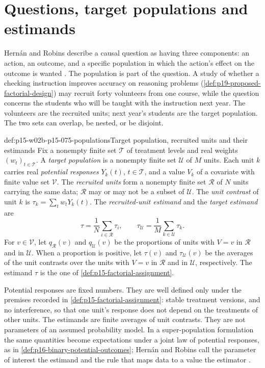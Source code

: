 \section{Questions, target populations and estimands}
\label{sec:p15-w02b-p15-075-estimands}

Hern\'an and Robins describe a causal question as having three components: an
action, an outcome, and a specific population in which the action's effect on
the outcome is wanted \cite[ch.~2, p.~13]{HernanRobins2020WhatIf2026}. The
population is part of the question. A study of whether a checking instruction
improves accuracy on reasoning problems (\cref{def:p19-proposed-factorial-design})
may recruit forty volunteers from one course, while the question concerns the
students who will be taught with the instruction next year. The volunteers are
the recruited units; next year's students are the target population. The two
sets can overlap, be nested, or be disjoint.

\begin{hbdefinition}{def:p15-w02b-p15-075-populations}{Target population, recruited units and their estimands}
Fix a nonempty finite set \(\mathcal T\) of treatment levels and real weights
\((w_t)_{t\in\mathcal T}\). A \emph{target population} is a nonempty finite
set \(\mathcal U\) of \(M\) units. Each unit \(k\) carries real
\emph{potential responses} \(Y_k(t)\), \(t\in\mathcal T\), and a value
\(V_k\) of a covariate with finite value set \(\mathcal V\). The
\emph{recruited units} form a nonempty finite set \(\mathcal R\) of \(N\)
units carrying the same data; \(\mathcal R\) may or may not be a subset of
\(\mathcal U\). The \emph{unit contrast} of unit \(k\) is
\(\tau_k=\sum_{t}w_tY_k(t)\). The \emph{recruited-unit estimand} and the
\emph{target estimand} are
\[
 \tau=\frac1N\sum_{i\in\mathcal R}\tau_i,\qquad
 \tau_{\mathcal U}=\frac1M\sum_{k\in\mathcal U}\tau_k .
\]
For \(v\in\mathcal V\), let \(q_{\mathcal R}(v)\) and \(q_{\mathcal U}(v)\)
be the proportions of units with \(V=v\) in \(\mathcal R\) and in
\(\mathcal U\). When a proportion is positive, let \(\tau(v)\) and
\(\tau_{\mathcal U}(v)\) be the averages of the unit contrasts over the units
with \(V=v\) in \(\mathcal R\) and in \(\mathcal U\), respectively. The
estimand \(\tau\) is the one of \cref{def:p15-factorial-assignment}.
\end{hbdefinition}

Potential responses are fixed numbers. They are well defined only under the
premises recorded in \cref{def:p15-factorial-assignment}: stable treatment
versions, and no interference, so that one unit's response does not depend on
the treatments of other units. The estimands are finite averages of unit
contrasts. They are not parameters of an assumed probability model. In a
super-population formulation the same quantities become expectations under a
joint law of potential responses, as in
\cref{def:p16-binary-potential-outcomes}; Hern\'an and Robins call the
parameter of interest the estimand and the rule that maps data to a value the
estimator \cite[\S10.1, p.~138]{HernanRobins2020WhatIf2026}.

